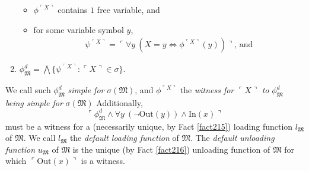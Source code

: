 \documentclass[12pt, twoside]{memoir}
\numberwithin{equation}{section}
\theoremstyle{definition}
\theoremstyle{remark}
\theoremstyle{definition}
\theoremstyle{definition}
\theoremstyle{definition}
\theoremstyle{remark}
\begin{document}
\begin{enumerate}[label=(\alph*)]
    \begin{itemize}[label=$\circ$, leftmargin=20pt]
        \item $\phi^{\ulcorner X \urcorner}$ contains $1$ free variable, and
        \item for some variable symbol $y$,
        \begin{align*}
            \psi^{\ulcorner X \urcorner} = \ulcorner \forall y \ (X = y \iff \phi^{\ulcorner X \urcorner}(y)) \urcorner \text{, and}
        \end{align*}
    \end{itemize}
    \item $\phi^d_{\mathfrak{M}} = \bigwedge \{\psi^{\ulcorner X \urcorner} : \ulcorner X \urcorner \in \sigma\}$.
\end{enumerate}
We call such $\phi^d_{\mathfrak{M}}$ \emph{simple for} $\sigma(\mathfrak{M})$, and $\phi^{\ulcorner X \urcorner}$ the \emph{witness for} $\ulcorner X \urcorner$ \emph{to} $\phi^d_{\mathfrak{M}}$ \emph{being simple for} $\sigma(\mathfrak{M})$ Additionally,
\begin{equation*}
    \ulcorner \phi^d_{\mathfrak{M}} \wedge \forall y \ (\neg \mathrm{Out}(y)) \wedge \mathrm{In}(x) \urcorner
\end{equation*}
must be a witness for a (necessarily unique, by Fact \ref{fact215}) loading function $l_{\mathfrak{M}}$ of $\mathfrak{M}$. We call $l_{\mathfrak{M}}$ the \emph{default loading function} of $\mathfrak{M}$. The \emph{default unloading function} $u_{\mathfrak{M}}$ of $\mathfrak{M}$ is the unique (by Fact \ref{fact216}) unloading function of $\mathfrak{M}$ for which $\ulcorner \mathrm{Out}(x) \urcorner$ is a witness.
\end{document}
